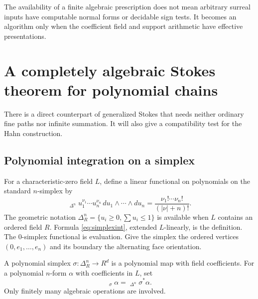 \documentclass[11pt,letterpaper]{article}
\theoremstyle{definition}
\theoremstyle{remark}
\newcommand{\PInt}{\mathop{\int^{\!\mathrm{pol}}}\nolimits}\newcommand{\ACoint}{\mathop{\oint^{\!\mathrm{alg}}}\nolimits}
\numberwithin{equation}{section}
\begin{document}
The availability of a finite algebraic prescription does not mean arbitrary surreal inputs have computable normal forms or decidable sign tests. It becomes an algorithm only when the coefficient field and support arithmetic have effective presentations.

\section{A completely algebraic Stokes theorem for polynomial chains}\label{sec:polynomial}
There is a direct counterpart of generalized Stokes that needs neither ordinary fine paths nor infinite summation. It will also give a compatibility test for the Hahn construction.

\subsection{Polynomial integration on a simplex}
For a characteristic-zero field $L$, define a linear functional on polynomials on the standard $n$-simplex by
\begin{equation}\label{eq:simplexint}
 \PInt_{\Delta^n}u_1^{\nu_1}\cdots u_n^{\nu_n}\,du_1\wedge\cdots\wedge du_n
 =\frac{\nu_1!\cdots\nu_n!}{(|\nu|+n)!}.
\end{equation}
The geometric notation $\Delta_R^n=\{u_i\ge0,\sum u_i\le1\}$ is available when $L$ contains an ordered field $R$. Formula \eqref{eq:simplexint}, extended $L$-linearly, is the definition. The $0$-simplex functional is evaluation. Give the simplex the ordered vertices $(0,e_1,\ldots,e_n)$ and its boundary the alternating face orientation.

A polynomial simplex $\sigma:\Delta_R^n\to R^d$ is a polynomial map with field coefficients. For a polynomial $n$-form $\alpha$ with coefficients in $L$, set
\[
 \PInt_\sigma\alpha=\PInt_{\Delta^n}\sigma^*\alpha.
\]
Only finitely many algebraic operations are involved.
\end{document}
